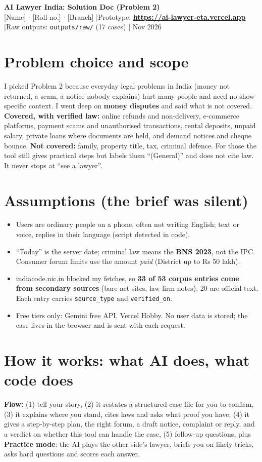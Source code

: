 \documentclass[9pt,a4paper]{extarticle}
\begin{document}
{\Large\bfseries AI Lawyer India: Solution Doc (Problem 2)}\\[1pt]
{\footnotesize\color{gray}[Name] $\cdot$ [Roll no.] $\cdot$ [Branch] \quad|\quad Prototype: \textbf{\url{https://ai-lawyer-eta.vercel.app}} \quad|\quad Raw outputs: \texttt{outputs/raw/} (17 cases) \quad| Nov 2026}

\section{Problem choice and scope}
I picked Problem 2 because everyday legal problems in India (money not returned, a scam, a notice nobody explains) hurt many people and need no show-specific context. I went deep on \textbf{money disputes} and said what is not covered. \textbf{Covered, with verified law:} online refunds and non-delivery, e-commerce platforms, payment scams and unauthorised transactions, rental deposits, unpaid salary, private loans where documents are held, and demand notices and cheque bounce. \textbf{Not covered:} family, property title, tax, criminal defence. For those the tool still gives practical steps but labels them ``(General)'' and does not cite law. It never stops at ``see a lawyer''.

\section{Assumptions (the brief was silent)}
\begin{itemize}
\item Users are ordinary people on a phone, often not writing English; text or voice, replies in their language (script detected in code).
\item ``Today'' is the server date; criminal law means the \textbf{BNS 2023}, not the IPC. Consumer forum limits use the amount \emph{paid} (District up to Rs 50 lakh).
\item indiacode.nic.in blocked my fetches, so \textbf{33 of 53 corpus entries come from secondary sources} (bare-act sites, law-firm notes); 20 are official text. Each entry carries \texttt{source\_type} and \texttt{verified\_on}.
\item Free tiers only: Gemini free API, Vercel Hobby. No user data is stored; the case lives in the browser and is sent with each request.
\end{itemize}

\section{How it works: what AI does, what code does}
\textbf{Flow:} (1) tell your story, (2) it restates a structured case file for you to confirm, (3) it explains where you stand, cites laws and asks what proof you have, (4) it gives a step-by-step plan, the right forum, a draft notice, complaint or reply, and a verdict on whether this tool can handle the case, (5) follow-up questions, plus \textbf{Practice mode}: the AI plays the other side's lawyer, briefs you on likely tricks, asks hard questions and scores each answer.
\end{document}
